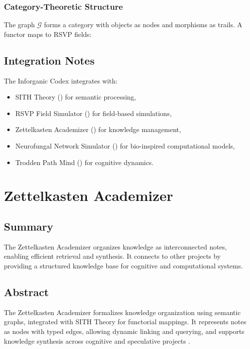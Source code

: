\documentclass[11pt,oneside]{memoir}
\theoremstyle{plain}
\newcommand{\F}{\mathcal{F}}
\begin{document}
\subsection{Category-Theoretic Structure}
The graph \(\mathcal{G}\) forms a category with objects as nodes and morphisms as trails. A functor maps to RSVP fields:

\section{Integration Notes}
The Inforganic Codex integrates with:
\begin{itemize}
    \item SITH Theory () for semantic processing,
    \item RSVP Field Simulator () for field-based simulations,
    \item Zettelkasten Academizer () for knowledge management,
    \item Neurofungal Network Simulator () for bio-inspired computational models,
    \item Trodden Path Mind () for cognitive dynamics.
\end{itemize}

\chapter{Zettelkasten Academizer}
\label{sec:zettelkasten}

\section{Summary}
The Zettelkasten Academizer organizes knowledge as interconnected notes, enabling efficient retrieval and synthesis. It connects to other projects by providing a structured knowledge base for cognitive and computational systems.

\section{Abstract}
The Zettelkasten Academizer formalizes knowledge organization using semantic graphs, integrated with SITH Theory for functorial mappings. It represents notes as nodes with typed edges, allowing dynamic linking and querying, and supports knowledge synthesis across cognitive and speculative projects \cite{maclane}.
\end{document}
